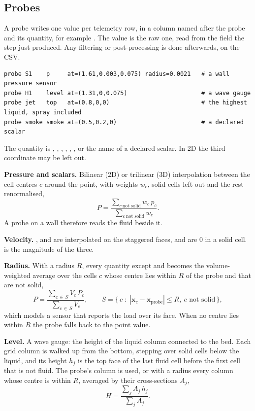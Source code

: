 \documentclass[10pt,a4paper]{article}
\newcommand{\code}[1]{\texttt{\detokenize{#1}}}
\begin{document}
\subsection{Probes}\label{sec:probes}

A probe writes one value per telemetry row, in a column named after the probe and its quantity, for example
\code{S1_p}. The value is the raw one, read from the field the step just produced. Any filtering or post-processing
is done afterwards, on the CSV.
\begin{lstlisting}[style=ex]
probe S1    p     at=(1.61,0.003,0.075) radius=0.0021   # a wall pressure sensor
probe H1    level at=(1.31,0,0.075)                     # a wave gauge
probe jet   top   at=(0.8,0,0)                          # the highest liquid, spray included
probe smoke smoke at=(0.5,0.2,0)                        # a declared scalar
\end{lstlisting}
The quantity is \code{p}, \code{u}, \code{v}, \code{w}, \code{speed}, \code{level}, \code{top} or the name of a
declared scalar. In 2D the third coordinate may be left out.

\textbf{Pressure and scalars.} Bilinear (2D) or trilinear (3D) interpolation between the cell centres $c$ around the
point, with weights $w_c$, solid cells left out and the rest renormalised,
\begin{equation*}
  P = \frac{\sum_{c\ \text{not solid}} w_c\,p_c}{\sum_{c\ \text{not solid}} w_c} .
\end{equation*}
A probe on a wall therefore reads the fluid beside it.

\textbf{Velocity.} \code{u}, \code{v} and \code{w} are interpolated on the staggered faces, and are 0 in a solid cell.
\code{speed} is the magnitude of the three.

\textbf{Radius.} With a radius $R$, every quantity except \code{level} and \code{top} becomes the volume-weighted
average over the cells $c$ whose centre lies within $R$ of the probe and that are not solid,
\begin{equation*}
  P = \frac{\sum_{c\,\in\,S} V_c\,P_c}{\sum_{c\,\in\,S} V_c}, \qquad
  S = \bigl\{\, c \;:\; |\mathbf{x}_c - \mathbf{x}_{\mathrm{probe}}| \le R,\ c \text{ not solid} \,\bigr\},
\end{equation*}
which models a sensor that reports the load over its face. When no centre lies within $R$ the probe falls back to the
point value.

\textbf{Level.} A wave gauge: the height of the liquid column connected to the bed. Each grid column is walked up from
the bottom, stepping over solid cells below the liquid, and its height $h_j$ is the top face of the last fluid cell
before the first cell that is not fluid. The probe's column is used, or with a radius every column whose centre is
within $R$, averaged by their cross-sections $A_j$,
\begin{equation*}
  H = \frac{\sum_j A_j\,h_j}{\sum_j A_j}.
\end{equation*}
\end{document}
